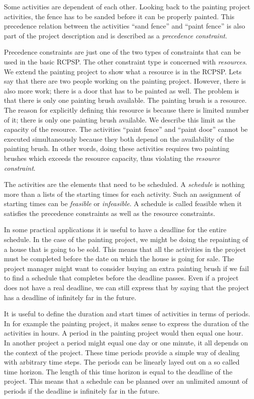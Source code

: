 \documentclass{article}
\theoremstyle{definition}
\begin{document}
Some activities are dependent of each other. 
Looking back to the painting project activities, the fence has to be sanded before it can be properly painted. 
This precedence relation between the activities ``sand fence'' and ``paint fence'' is also part of the project description and is described as a \emph{precedence constraint}. 

Precedence constraints are just one of the two types of constraints that can be used in the basic RCPSP. 
The other constraint type is concerned with \emph{resources}. 
We extend the painting project to show what a resource is in the RCPSP. 
Lets say that there are two people working on the painting project. 
However, there is also more work; there is a door that has to be painted as well. 
The problem is that there is only one painting brush available. The painting brush is a resource. 
The reason for explicitly defining this resource is because there is limited number of it; there is only one painting brush available. 
We describe this limit as the capacity of the resource. 
The activities ``paint fence'' and ``paint door'' cannot be executed simultaneously because they both depend on the availability of the painting brush. 
In other words, doing these activities requires two painting brushes which exceeds the resource capacity, thus violating the \emph{resource constraint}. 

The activities are the elements that need to be scheduled. 
A \emph{schedule} is nothing more than a lists of the starting times for each activity. 
Such an assignment of starting times can be \emph{feasible} or \emph{infeasible}. 
A schedule is called feasible when it satisfies the precedence constraints as well as the resource constraints. 

In some practical applications it is useful to have a deadline for the entire schedule. 
In the case of the painting project, we might be doing the repainting of a house that is going to be sold. 
This means that all the activities in the project must be completed before the date on which the house is going for sale. 
The project manager might want to consider buying an extra painting brush if we fail to find a schedule that completes before the deadline passes. 
Even if a project does not have a real deadline, we can still express that by saying that the project has a deadline of infinitely far in the future. 

It is useful to define the duration and start times of activities in terms of periods. 
In for example the painting project, it makes sense to express the duration of the activities in hours. 
A period in the painting project would then equal one hour. 
In another project a period might equal one day or one minute, it all depends on the context of the project. 
These time periods provide a simple way of dealing with arbitrary time steps. 
The periods can be linearly layed out on a so called time horizon. 
The length of this time horizon is equal to the deadline of the project. 
This means that a schedule can be planned over an unlimited amount of periods if the deadline is infinitely far in the future. 
\end{document}
